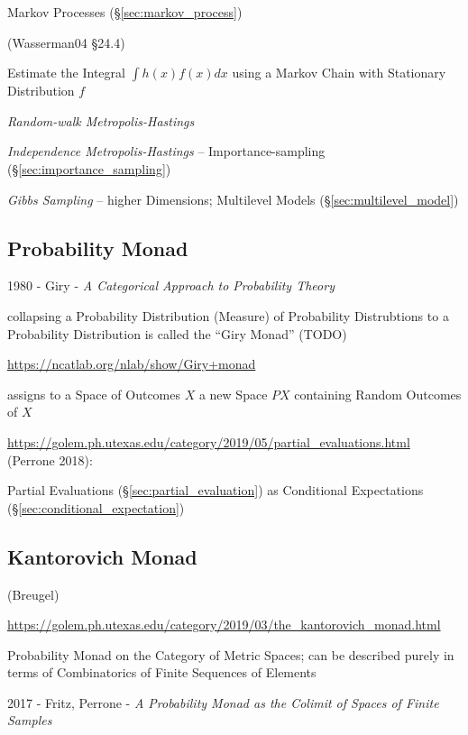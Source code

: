 Markov Processes (\S\ref{sec:markov_process})

(Wasserman04 \S24.4)

Estimate the Integral $\int h(x) f(x) dx$ using a Markov Chain with Stationary
Distribution $f$

\emph{Random-walk Metropolis-Hastings}

\emph{Independence Metropolis-Hastings} -- Importance-sampling
(\S\ref{sec:importance_sampling})

\emph{Gibbs Sampling} -- higher Dimensions; Multilevel Models
(\S\ref{sec:multilevel_model})



\subsection{Probability Monad}\label{sec:probability_monad}

1980 - Giry - \emph{A Categorical Approach to Probability Theory}

collapsing a Probability Distribution (Measure) of Probability Distrubtions to a
Probability Distribution is called the ``Giry Monad'' (TODO)

\url{https://ncatlab.org/nlab/show/Giry+monad}

assigns to a Space of Outcomes $X$ a new Space $P X$ containing Random Outcomes
of $X$

\url{https://golem.ph.utexas.edu/category/2019/05/partial_evaluations.html}
(Perrone 2018):

Partial Evaluations (\S\ref{sec:partial_evaluation}) as Conditional Expectations
(\S\ref{sec:conditional_expectation})



\subsection{Kantorovich Monad}\label{sec:kantorovich_monad}

(Breugel)

\url{https://golem.ph.utexas.edu/category/2019/03/the_kantorovich_monad.html}

Probability Monad on the Category of Metric Spaces; can be described purely in
terms of Combinatorics of Finite Sequences of Elements

2017 - Fritz, Perrone - \emph{A Probability Monad as the Colimit of Spaces of
  Finite Samples}



